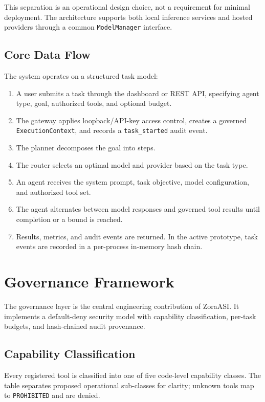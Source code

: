 \documentclass[11pt]{article}
\begin{document}
This separation is an operational design choice, not a requirement for minimal deployment. The architecture supports both local inference services and hosted providers through a common \texttt{ModelManager} interface.

\subsection{Core Data Flow}

The system operates on a structured task model:

\begin{enumerate}[leftmargin=*]
  \item A user submits a task through the dashboard or REST API, specifying agent type, goal, authorized tools, and optional budget.
  \item The gateway applies loopback/API-key access control, creates a governed \texttt{ExecutionContext}, and records a \texttt{task\_started} audit event.
  \item The planner decomposes the goal into steps.
  \item The router selects an optimal model and provider based on the task type.
  \item An agent receives the system prompt, task objective, model configuration, and authorized tool set.
  \item The agent alternates between model responses and governed tool results until completion or a bound is reached.
  \item Results, metrics, and audit events are returned. In the active prototype, task events are recorded in a per-process in-memory hash chain.
\end{enumerate}

\section{Governance Framework}

The governance layer is the central engineering contribution of ZoraASI. It implements a default-deny security model with capability classification, per-task budgets, and hash-chained audit provenance.

\subsection{Capability Classification}

Every registered tool is classified into one of five code-level capability classes. The
table separates proposed operational sub-classes for clarity; unknown tools map to
\texttt{PROHIBITED} and are denied.
\end{document}
